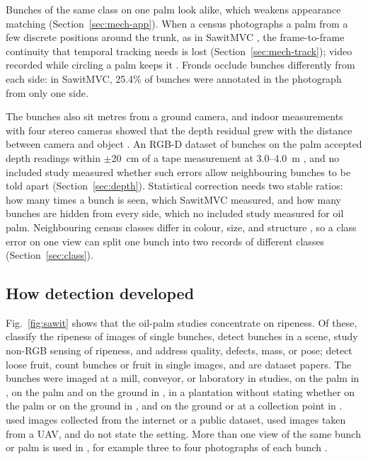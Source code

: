 Bunches of the same class on one palm look alike, which weakens appearance matching (Section~\ref{sec:mech-app}). When a census photographs a palm from a few discrete positions around the trunk, as in SawitMVC \citep{indriani2026sawitmvc}, the frame-to-frame continuity that temporal tracking needs is lost (Section~\ref{sec:mech-track}); video recorded while circling a palm keeps it \citep{suharjito2025oil}. Fronds occlude bunches differently from each side: in SawitMVC, 25.4\% of bunches were annotated in the photograph from only one side.

The bunches also sit metres from a ground camera, and indoor measurements with four stereo cameras showed that the depth residual grew with the distance between camera and object \citep{neupane2021evaluation}. An RGB-D dataset of bunches on the palm accepted depth readings within $\pm$20~cm of a tape measurement at 3.0--4.0~m \citep{goh2025outdoor}, and no included study measured whether such errors allow neighbouring bunches to be told apart (Section~\ref{sec:depth}). Statistical correction needs two stable ratios: how many times a bunch is seen, which SawitMVC measured, and how many bunches are hidden from every side, which no included study measured for oil palm. Neighbouring census classes differ in colour, size, and structure \citep{indriani2026sawitmvc}, so a class error on one view can split one bunch into two records of different classes (Section~\ref{sec:class}).

\subsection{How detection developed}
Fig.~\ref{fig:sawit} shows that the \nPalm oil-palm studies concentrate on ripeness. Of these, \nPalmCls classify the ripeness of images of single bunches, \nPalmDet detect bunches in a scene, \nPalmSensor study non-RGB sensing of ripeness, and \nPalmQual address quality, defects, mass, or pose; \nPalmLoose detect loose fruit, \nPalmCount count bunches or fruit in single images, and \nPalmData are dataset papers. The bunches were imaged at a mill, conveyor, or laboratory in \nPalmMill studies, on the palm in \nPalmOnTree, on the palm and on the ground in \nPalmMixed, in a plantation without stating whether on the palm or on the ground in \nPalmField, and on the ground or at a collection point in \nPalmGround. \nPalmWeb used images collected from the internet or a public dataset, \nPalmUav used images taken from a UAV, and \nPalmUnstated do not state the setting. More than one view of the same bunch or palm is used in \nPalmViews, for example three to four photographs of each bunch \citep{omar2024outdoor}.

